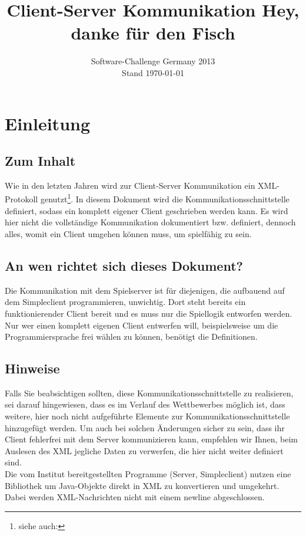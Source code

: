 \documentclass[12pt,a4paper, ngerman, oneside]{scrartcl}
\date{Software-Challenge Germany 2013\\Stand \today}
\title{Client-Server Kommunikation Hey, danke für den Fisch}
\begin{document}
\maketitle
\thispagestyle{empty}
\tableofcontents
\thispagestyle{empty}
\newpage
\setcounter{page}{1}
\section{Einleitung}
\subsection*{Zum Inhalt} Wie in den letzten Jahren wird zur Client-Server
Kommunikation ein XML-Protokoll genutzt\footnote{siehe auch:
}. In diesem
Dokument wird die Kommunikationsschnittstelle definiert, sodass ein komplett
eigener Client geschrieben werden kann. Es wird hier nicht die vollständige
Kommunikation dokumentiert bzw. definiert, dennoch alles, womit ein Client
umgehen können muss, um spielfähig zu sein.
\subsection*{An wen richtet sich dieses Dokument?} Die Kommunikation mit dem
Spielserver ist für diejenigen, die aufbauend auf dem Simpleclient
programmieren, unwichtig. Dort steht bereits ein funktionierender Client bereit
und es muss nur die Spiellogik entworfen werden. \\
Nur wer einen komplett eigenen Client entwerfen will, beispielsweise um die
Programmiersprache frei wählen zu können, benötigt die Definitionen.

\subsection*{Hinweise} Falls Sie beabsichtigen sollten, diese
Kommunikationsschnittstelle zu realisieren, sei darauf hingewiesen, dass es im
Verlauf des Wettbewerbes möglich ist, dass weitere, hier noch nicht aufgeführte
Elemente zur Kommunikationsschnittstelle hinzugefügt werden. Um auch bei solchen
Änderungen sicher zu sein, dass ihr Client fehlerfrei mit dem Server
kommunizieren kann, empfehlen wir Ihnen, beim Auslesen des XML jegliche Daten zu
verwerfen, die hier nicht weiter definiert sind. \bigskip \\
Die vom Institut bereitgestellten Programme (Server, Simpleclient) nutzen eine
Bibliothek um Java-Objekte direkt in XML zu konvertieren und umgekehrt. 
Dabei werden XML-Nachrichten nicht mit einem newline abgeschlossen.
\end{document}
